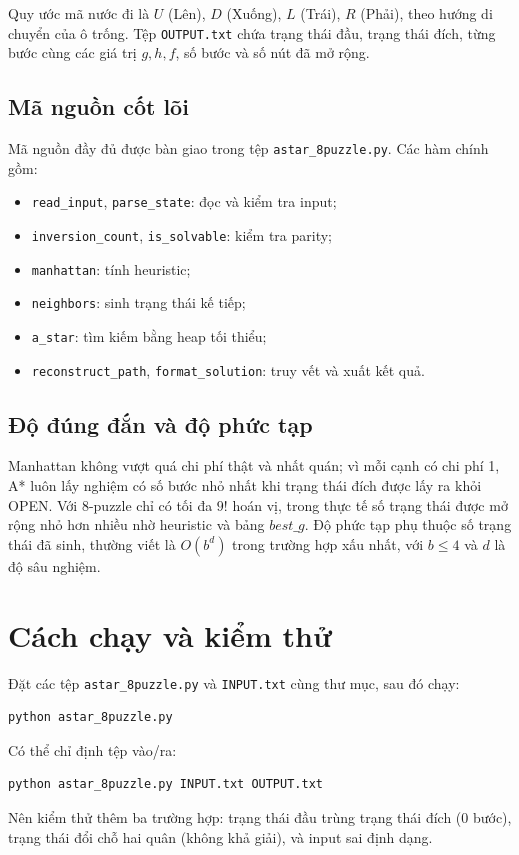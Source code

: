 \documentclass[12pt,a4paper]{article}
\begin{document}
Quy ước mã nước đi là $U$ (Lên), $D$ (Xuống), $L$ (Trái), $R$ (Phải),
theo hướng di chuyển của ô trống. Tệp \texttt{OUTPUT.txt} chứa trạng thái
đầu, trạng thái đích, từng bước cùng các giá trị $g,h,f$, số bước và số
nút đã mở rộng.

\subsection{Mã nguồn cốt lõi}

Mã nguồn đầy đủ được bàn giao trong tệp \texttt{astar\_8puzzle.py}. Các
hàm chính gồm:
\begin{itemize}
    \item \texttt{read\_input}, \texttt{parse\_state}: đọc và kiểm tra input;
    \item \texttt{inversion\_count}, \texttt{is\_solvable}: kiểm tra parity;
    \item \texttt{manhattan}: tính heuristic;
    \item \texttt{neighbors}: sinh trạng thái kế tiếp;
    \item \texttt{a\_star}: tìm kiếm bằng heap tối thiểu;
    \item \texttt{reconstruct\_path}, \texttt{format\_solution}: truy vết và xuất kết quả.
\end{itemize}

\subsection{Độ đúng đắn và độ phức tạp}

Manhattan không vượt quá chi phí thật và nhất quán; vì mỗi cạnh có chi phí
1, A* luôn lấy nghiệm có số bước nhỏ nhất khi trạng thái đích được lấy ra
khỏi OPEN. Với 8-puzzle chỉ có tối đa $9!$ hoán vị, trong thực tế số trạng
thái được mở rộng nhỏ hơn nhiều nhờ heuristic và bảng $best\_g$. Độ phức tạp
phụ thuộc số trạng thái đã sinh, thường viết là $O(b^d)$ trong trường hợp
xấu nhất, với $b\le4$ và $d$ là độ sâu nghiệm.

\section{Cách chạy và kiểm thử}

Đặt các tệp \texttt{astar\_8puzzle.py} và \texttt{INPUT.txt} cùng thư mục,
sau đó chạy:
\begin{lstlisting}
python astar_8puzzle.py
\end{lstlisting}
Có thể chỉ định tệp vào/ra:
\begin{lstlisting}
python astar_8puzzle.py INPUT.txt OUTPUT.txt
\end{lstlisting}

Nên kiểm thử thêm ba trường hợp: trạng thái đầu trùng trạng thái đích (0
bước), trạng thái đổi chỗ hai quân (không khả giải), và input sai định dạng.
\end{document}
